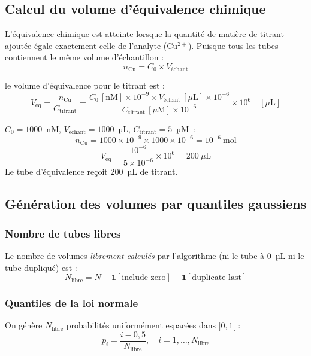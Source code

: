 \documentclass[12pt, a4paper]{article}
\begin{document}
\subsection{Calcul du volume d'équivalence chimique}

L'équivalence chimique est atteinte lorsque la quantité de matière de titrant
ajoutée égale exactement celle de l'analyte (Cu$^{2+}$). Puisque tous les
tubes contiennent le même volume d'échantillon :
\[
n_\text{Cu} = C_0 \times V_\text{échant}
\]

le volume d'équivalence pour le titrant est :
\[
\boxed{
V_\text{eq} = \frac{n_\text{Cu}}{C_\text{titrant}}
            = \frac{C_0\,[\text{nM}] \times 10^{-9}
                   \times V_\text{échant}\,[\mu\text{L}] \times 10^{-6}}
                  {C_\text{titrant}\,[\mu\text{M}] \times 10^{-6}}
            \times 10^6
            \quad [\mu\text{L}]
}
\]

\begin{exemple}
$C_0 = 1000$~nM, $V_\text{échant} = 1000$~µL, $C_\text{titrant} = 5$~µM~:
\[
n_\text{Cu} = 1000 \times 10^{-9} \times 1000 \times 10^{-6}
            = 10^{-6}~\text{mol}
\]
\[
V_\text{eq} = \frac{10^{-6}}{5 \times 10^{-6}} \times 10^6
            = 200~\mu\text{L}
\]
Le tube d'équivalence reçoit 200~µL de titrant.
\end{exemple}

\subsection{Génération des volumes par quantiles gaussiens}

\subsubsection{Nombre de tubes libres}

Le nombre de volumes \emph{librement calculés} par l'algorithme (ni le
tube à 0~µL ni le tube dupliqué) est :
\[
N_\text{libre} = N - \mathbf{1}[\text{include\_zero}]
                   - \mathbf{1}[\text{duplicate\_last}]
\]

\subsubsection{Quantiles de la loi normale}

On génère $N_\text{libre}$ probabilités uniformément espacées dans $]0,1[$ :
\[
p_i = \frac{i - 0{,}5}{N_\text{libre}}, \quad i = 1, \ldots, N_\text{libre}
\]
\end{document}
